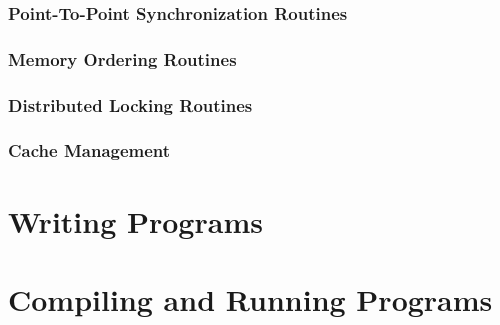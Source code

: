 \documentclass[10pt]{book}
\begin{document}
{\subsection{Point-To-Point Synchronization Routines}%
\label{subsec:shmem_wait}
\subsection{Memory Ordering Routines} %
\label{subsec:memory_order}
\label{subsec:shmem_fence}
\label{subsec:shmem_quiet}

\subsection{Distributed Locking Routines}
\subsection{Cache Management}

\clearpage
%
%

\appendix
\pagestyle{fancy} \withlinenumbers
\fancyhf{}
\fancyhead[RE, LO]{\leftmark}
\fancyhead[RO, LE]{\thepage}
\fancyfoot[CE,CO]{\thepage}
\renewcommand{\headrulewidth}{0pt}
\chapter{Writing \openshmem Programs}

\chapter{Compiling and Running Programs}

}
\end{document}
